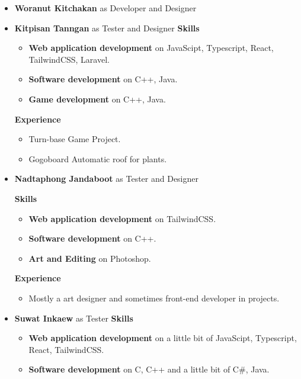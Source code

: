 \documentclass[a4paper, 12pt]{report}
\begin{document}
\begin{itemize}
            \item \textbf{Woranut Kitchakan} as Developer and Designer

            \item \textbf{Kitpisan Tanngan} as Tester and Designer
                \textbf{Skills}
                \begin{itemize}
                    \item \textbf{Web application development} on JavaScipt, Typescript, React, TailwindCSS, Laravel.
                    \item \textbf{Software development} on  C++, Java.
                    \item \textbf{Game development} on C++, Java.
                \end{itemize}
            
                \textbf{Experience}
                \begin{itemize}
                    \item Turn-base Game Project.
                    \item Gogoboard Automatic roof for plants.
                \end{itemize}

            \item \textbf{Nadtaphong Jandaboot} as Tester and Designer
            
                \textbf{Skills}
                \begin{itemize}
                    \item \textbf{Web application development} on TailwindCSS.
                    \item \textbf{Software development} on C++.
                    \item \textbf{Art and Editing} on Photoshop. 
                \end{itemize}

                \textbf{Experience}
                \begin{itemize}
                    \item Mostly a art designer and sometimes front-end developer in projects. 
                \end{itemize}

            \item \textbf{Suwat Inkaew} as Tester
            \textbf{Skills}
                \begin{itemize}
                    \item \textbf{Web application development} on a little bit of JavaScipt, Typescript, React, TailwindCSS.
                    \item \textbf{Software development} on C, C++ and a little bit of C\#, Java.
                \end{itemize}
                

\end{itemize}
\end{document}
